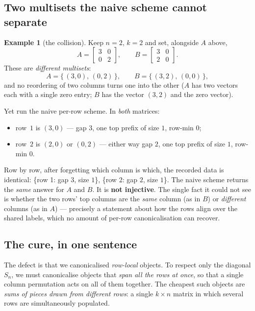 \documentclass[11pt,a4paper]{article}
\theoremstyle{definition}
\newtheorem{example}[definition]{Example}
\theoremstyle{plain}
\newcommand{\Sn}{S_n}
\begin{document}
\subsection{Two multisets the naive scheme cannot separate}

\begin{example}[the collision]\label{ex:collision}
Keep $n=2$, $k=2$ and set, alongside $A$ above,
\[
   A=\begin{bmatrix}3&0\\0&2\end{bmatrix},
   \qquad
   B=\begin{bmatrix}3&0\\2&0\end{bmatrix}.
\]
These are \emph{different multisets}:
\[
   A=\bigl\{\,(3,0),\,(0,2)\,\bigr\},
   \qquad
   B=\bigl\{\,(3,2),\,(0,0)\,\bigr\},
\]
and no reordering of two columns turns one into the other ($A$ has two vectors
each with a single zero entry; $B$ has the vector $(3,2)$ and the zero vector).

Yet run the naive per-row scheme. In \emph{both} matrices:
\begin{itemize}[nosep,leftmargin=*]
\item row~$1$ is $(3,0)$ --- gap $3$, one top prefix of size $1$, row-min $0$;
\item row~$2$ is $(2,0)$ or $(0,2)$ --- either way gap $2$, one top prefix of
      size $1$, row-min $0$.
\end{itemize}
Row by row, after forgetting which column is which, the recorded data is
identical: \{row 1: gap $3$, size $1$\}, \{row 2: gap $2$, size $1$\}. The naive
scheme returns the \emph{same} answer for $A$ and $B$. It is \textbf{not
injective}. The single fact it could not see is whether the two rows' top
columns are the \emph{same} column (as in $B$) or \emph{different} columns
(as in $A$) --- precisely a statement about how the rows align over the shared
labels, which no amount of per-row canonicalisation can recover.
\end{example}

\subsection{The cure, in one sentence}

The defect is that we canonicalised \emph{row-local} objects. To respect only
the diagonal $\Sn$, we must canonicalise objects that \emph{span all the rows at
once}, so that a single column permutation acts on all of them together. The
cheapest such objects are \emph{sums of pieces drawn from different rows}: a
single $k\times n$ matrix in which several rows are simultaneously populated.
\end{document}

